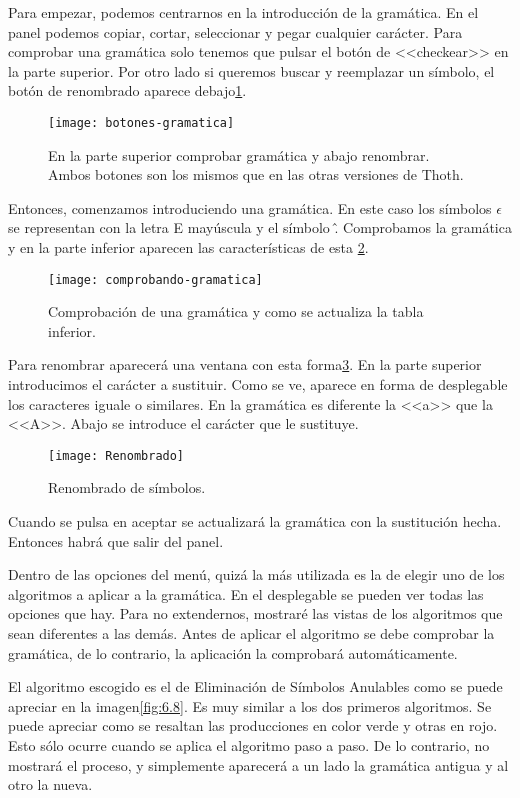 Para empezar, podemos centrarnos en la introducción de la gramática. En el panel podemos copiar, cortar, seleccionar y pegar cualquier carácter. Para comprobar una gramática solo tenemos que pulsar el botón de <<checkear>> en la parte superior. Por otro lado si queremos buscar y reemplazar un símbolo, el botón de renombrado aparece debajo\ref{fig:6.5}. 

\begin{figure}[h]
\centering
\texttt{[image: botones-gramatica]}
\caption{En la parte superior comprobar gramática y abajo renombrar. Ambos botones son los mismos que en las otras versiones de Thoth.}
\label{fig:6.5}
\end{figure}

Entonces, comenzamos introduciendo una gramática. En este caso los símbolos $\epsilon$ se representan con la letra E mayúscula y el símbolo \^. Comprobamos la gramática y en la parte inferior aparecen las características de esta \ref{fig:6.6}.  

\begin{figure}[h]
\centering
\texttt{[image: comprobando-gramatica]}
\caption{Comprobación de una gramática y como se actualiza la tabla inferior.}
\label{fig:6.6}
\end{figure}

Para renombrar aparecerá una ventana con esta forma\ref{fig:6.7}. En la parte superior introducimos el carácter a sustituir. Como se ve, aparece en forma de desplegable los caracteres iguale o similares. En la gramática es diferente la <<a>> que la <<A>>. Abajo se introduce el carácter que le sustituye.

\begin{figure}[h]
\centering
\texttt{[image: Renombrado]}
\caption{Renombrado de símbolos.}
\label{fig:6.7}
\end{figure}

Cuando se pulsa en aceptar se actualizará la gramática con la sustitución hecha. Entonces habrá que salir del panel.

Dentro de las opciones del menú, quizá la más utilizada es la de elegir uno de los algoritmos a aplicar a la gramática. En el desplegable se pueden ver todas las opciones que hay. Para no extendernos, mostraré las vistas de los algoritmos que sean diferentes a las demás. Antes de aplicar el algoritmo se debe comprobar la gramática, de lo contrario, la aplicación la comprobará automáticamente.

El algoritmo escogido es el de Eliminación de Símbolos Anulables como se puede apreciar en la imagen\ref{fig:6.8}. Es muy similar a los dos primeros algoritmos. Se puede apreciar como se resaltan las producciones en color verde y otras en rojo. Esto sólo ocurre cuando se aplica el algoritmo paso a paso. De lo contrario, no mostrará el proceso, y simplemente aparecerá a un lado la gramática antigua y al otro la nueva.

